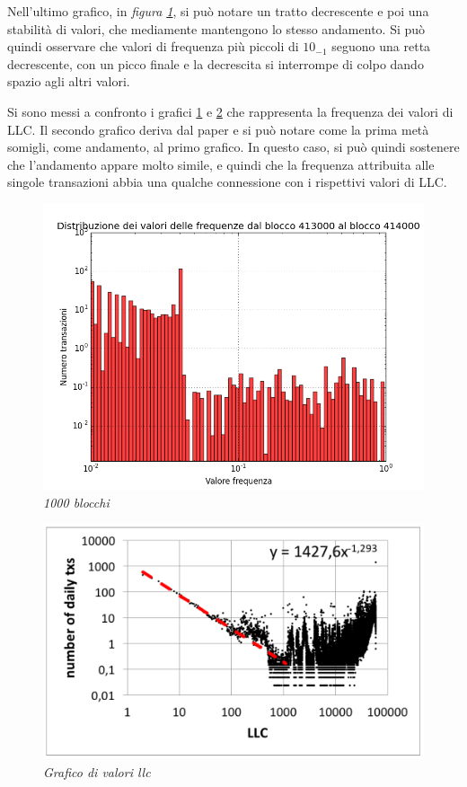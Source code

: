 Nell'ultimo grafico, in \textit{figura \ref{fig:hist1000b}}, si può notare un tratto decrescente e poi una stabilità di valori, che mediamente mantengono lo stesso andamento. Si può quindi osservare che valori di frequenza più piccoli di $10_{-1}$ seguono una retta decrescente, con un picco finale e la decrescita si interrompe di colpo dando spazio agli altri valori.

Si sono messi a confronto i grafici \ref{fig:hist1000b} e \ref{graphpaper} che rappresenta la frequenza dei valori di LLC. Il secondo grafico deriva dal paper \cite{ddp-ltcbh-17} e si può notare come la prima metà somigli, come andamento, al primo grafico. In questo caso, si può quindi sostenere che l'andamento appare molto simile, e quindi che la frequenza attribuita alle singole transazioni abbia una qualche connessione con i rispettivi valori di LLC.


\begin{figure}[htbp]
	\centering
	\includegraphics[width=\textwidth]{figure/hist1000b}
	\caption{\textit{1000 blocchi}\label{fig:hist1000b}}
\end{figure}

\begin{figure}
	\centering
	\includegraphics[width=0.6 \textwidth]{figure/graphpaper}
	\caption{\textit{Grafico di valori llc \cite{ddp-ltcbh-17} }\label{graphpaper}}
\end{figure}